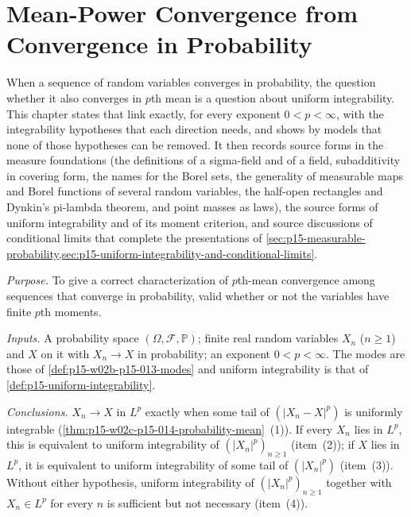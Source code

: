 \chapter{Mean-Power Convergence from Convergence in Probability}
\label{sec:p15-w02c-p15-014-probability-mean}

When a sequence of random variables converges in probability, the
question whether it also converges in \(p\)th mean is a question about
uniform integrability. This chapter states that link exactly, for every
exponent \(0<p<\infty\), with the integrability hypotheses that each
direction needs, and shows by models that none of those hypotheses can
be removed. It then records source forms in the measure foundations
(the definitions of a sigma-field and of a field, subadditivity in
covering form, the names for the Borel sets, the generality of measurable maps and Borel functions of
several random variables, the half-open rectangles
and Dynkin's pi-lambda theorem, and point masses as laws), the source forms of uniform integrability and
of its moment criterion, and source discussions of conditional limits
that complete the presentations of
\cref{sec:p15-measurable-probability,sec:p15-uniform-integrability-and-conditional-limits}.

\emph{Purpose.} To give a correct characterization of \(p\)th-mean
convergence among sequences that converge in probability, valid
whether or not the variables have finite \(p\)th moments.

\emph{Inputs.} A probability space \((\Omega,\mathcal F,\mathbb P)\);
finite real random variables \(X_n\) (\(n\geq1\)) and \(X\) on it with
\(X_n\to X\) in probability; an exponent \(0<p<\infty\). The modes are
those of \cref{def:p15-w02b-p15-013-modes} and uniform integrability is
that of \cref{def:p15-uniform-integrability}.

\emph{Conclusions.} \(X_n\to X\) in \(L^p\) exactly when some tail of
\((|X_n-X|^p)\) is uniformly integrable
(\cref{thm:p15-w02c-p15-014-probability-mean}~(1)). If every \(X_n\)
lies in \(L^p\), this is equivalent to uniform integrability of
\((|X_n|^p)_{n\geq1}\) (item~(2)); if \(X\) lies in \(L^p\), it is
equivalent to uniform integrability of some tail of \((|X_n|^p)\)
(item~(3)). Without either hypothesis, uniform integrability of
\((|X_n|^p)_{n\geq1}\) together with \(X_n\in L^p\) for every \(n\) is
sufficient but not necessary (item~(4)).

